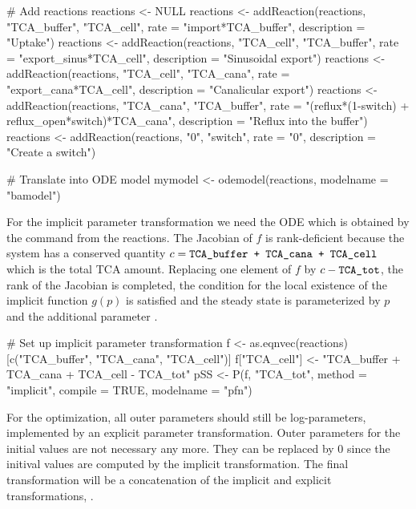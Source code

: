 \documentclass[article]{jss}
\begin{document}
\begin{CodeChunk}
\begin{CodeInput}
# Add reactions
reactions <- NULL
reactions <- addReaction(reactions, "TCA_buffer", "TCA_cell",
		 rate = "import*TCA_buffer",
		 description = "Uptake")
reactions <- addReaction(reactions, "TCA_cell", "TCA_buffer",
		 rate = "export_sinus*TCA_cell",
		 description = "Sinusoidal export")
reactions <- addReaction(reactions, "TCA_cell", "TCA_cana",
		 rate = "export_cana*TCA_cell",
		 description = "Canalicular export")
reactions <- addReaction(reactions, "TCA_cana", "TCA_buffer",
		 rate = "(reflux*(1-switch) + reflux_open*switch)*TCA_cana",
		 description = "Reflux into the buffer")
reactions <- addReaction(reactions, "0", "switch",
		 rate = "0",
		 description = "Create a switch")

# Translate into ODE model
mymodel <- odemodel(reactions, modelname = "bamodel")
\end{CodeInput}
\end{CodeChunk}

For the implicit parameter transformation we need the ODE which is obtained by the command  from the reactions. The Jacobian of $f$ is rank-deficient because the system has a conserved quantity $c = \verb!TCA_buffer + TCA_cana + TCA_cell!$ which is the total TCA amount. Replacing one element of $f$ by $c - \verb!TCA_tot!$, the rank of the Jacobian is completed, the condition for the local existence of the implicit function $g(p)$ is satisfied and the steady state is parameterized by $p$ and the additional parameter .

\begin{CodeChunk}
\begin{CodeInput}
# Set up implicit parameter transformation
f <- as.eqnvec(reactions)[c("TCA_buffer", "TCA_cana", "TCA_cell")]
f["TCA_cell"] <- "TCA_buffer + TCA_cana + TCA_cell - TCA_tot"
pSS <- P(f, "TCA_tot", method = "implicit",
         compile = TRUE, modelname = "pfn")
\end{CodeInput}
\end{CodeChunk}

For the optimization, all outer parameters should still be log-parameters, implemented by an explicit parameter transformation. Outer parameters for the initial values are not necessary any more. They can be replaced by 0 since the initival values are computed by the implicit transformation. The final transformation will be a concatenation of the implicit and explicit transformations, .
\end{document}
